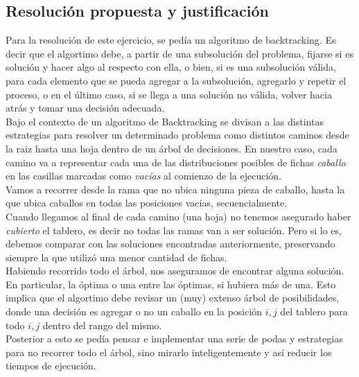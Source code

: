 \newpage

\subsection{Resoluci\'on propuesta y justificaci\'on}
Para la resoluci\'on de este ejercicio, se ped\'ia un algoritmo de backtracking. Es decir que el algortimo debe, a partir de una subsoluci\'on del problema, fijarse si es soluci\'on y hacer algo  al respecto con ella, o bien, si es una subsoluci\'on v\'alida, para cada elemento que se pueda agregar a la subsoluci\'on, agregarlo y repetir el proceso, o en el \'ultimo caso, si se llega a una soluci\'on no v\'alida, volver hacia atr\'as y tomar una decisi\'on adecuada.\\

Bajo el contexto de un algoritmo de Backtracking se divisan a las distintas estrategias para resolver un determinado problema como distintos caminos desde la raiz hasta una hoja dentro de un \'arbol de decisiones. En nuestro caso, cada camino va a representar cada una de las distribuciones posibles de fichas \emph{caballo} en las casillas marcadas como \emph{vac\'ias} al comienzo de la ejecuci\'on.\\

Vamos a recorrer desde la rama que no ubica ninguna pieza de caballo, hasta la que ubica caballos en todas las posiciones vac\'ias, secuencialmente.\\

Cuando llegamos al final de cada camino (una hoja) no tenemos asegurado haber \emph{cubierto} el tablero, es decir no todas las ramas van a ser soluci\'on. Pero si lo es, debemos comparar con las soluciones encontradas anteriormente, preservando siempre la que utiliz\'o una menor cantidad de fichas.\\

Habiendo recorrido todo el \'arbol, nos aseguramos de encontrar alguna soluci\'on. En particular, la \'optima o una entre las \'optimas, si hubiera m\'as de una. Esto implica que el algortimo debe revisar un (muy) extenso \'arbol de posibilidades, donde una decisi\'on es agregar o no un caballo en la posici\'on $i, j$ del tablero para todo $i, j$ dentro del rango del mismo. \\

Posterior a esto se ped\'ia pensar e implementar una serie de podas y estrategias para no recorrer todo el \'arbol, sino mirarlo inteligentemente y as\'i reducir los tiempos de ejecuci\'on.\\

